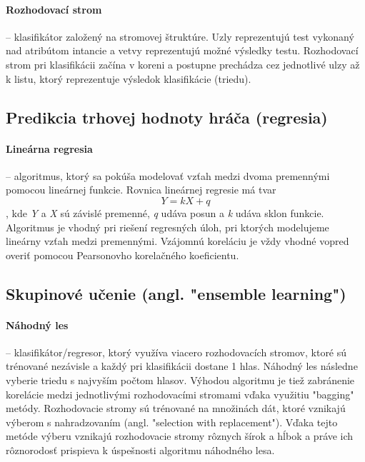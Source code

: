 \documentclass[runningheads]{llncs}
\begin{document}
\paragraph{Rozhodovací strom} --
klasifikátor založený na stromovej štruktúre. Uzly reprezentujú test vykonaný nad atribútom intancie a vetvy reprezentujú možné výsledky testu. Rozhodovací strom pri klasifikácii začína v koreni a postupne prechádza cez jednotlivé ulzy až k listu, ktorý reprezentuje výsledok klasifikácie (triedu). 

\subsection{Predikcia trhovej hodnoty hráča (regresia)}

\paragraph{Lineárna regresia} --
algoritmus, ktorý sa pokúša modelovať vzťah medzi dvoma premennými pomocou lineárnej funkcie. Rovnica lineárnej regresie má tvar \[Y = kX + q\], kde \textit{Y} a \textit{X} sú závislé premenné, \textit{q} udáva posun a \textit{k} udáva sklon funkcie. Algoritmus je vhodný pri riešení regresných úloh, pri ktorých modelujeme lineárny vzťah medzi premennými. Vzájomnú koreláciu je vždy vhodné vopred overiť pomocou Pearsonovho korelačného koeficientu. 

\subsection{Skupinové učenie (angl. "ensemble learning")}

\paragraph{Náhodný les} --
klasifikátor/regresor, ktorý využíva viacero rozhodovacích stromov, ktoré sú trénované nezávisle a každý pri klasifikácii dostane 1 hlas. Náhodný les následne vyberie triedu s najvyším počtom hlasov. Výhodou algoritmu je tiež zabránenie korelácie medzi jednotlivými rozhodovacími stromami vďaka využitiu "bagging" metódy. Rozhodovacie stromy sú trénované na množinách dát, ktoré vznikajú výberom s nahradzovaním (angl. "selection with replacement"). Vďaka tejto metóde výberu vznikajú rozhodovacie stromy rôznych šírok a hĺbok a práve ich rôznorodosť prispieva k úspešnosti algoritmu náhodného lesa.
\end{document}
